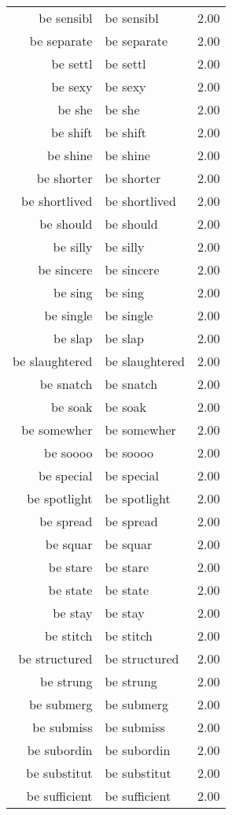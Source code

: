 \begin{table}[ht]
\begin{tabular}{rlr}
  be sensibl & be sensibl & 2.00 \\ 
  be separate & be separate & 2.00 \\ 
  be settl & be settl & 2.00 \\ 
  be sexy & be sexy & 2.00 \\ 
  be she & be she & 2.00 \\ 
  be shift & be shift & 2.00 \\ 
  be shine & be shine & 2.00 \\ 
  be shorter & be shorter & 2.00 \\ 
  be shortlived & be shortlived & 2.00 \\ 
  be should & be should & 2.00 \\ 
  be silly & be silly & 2.00 \\ 
  be sincere & be sincere & 2.00 \\ 
  be sing & be sing & 2.00 \\ 
  be single & be single & 2.00 \\ 
  be slap & be slap & 2.00 \\ 
  be slaughtered & be slaughtered & 2.00 \\ 
  be snatch & be snatch & 2.00 \\ 
  be soak & be soak & 2.00 \\ 
  be somewher & be somewher & 2.00 \\ 
  be soooo & be soooo & 2.00 \\ 
  be special & be special & 2.00 \\ 
  be spotlight & be spotlight & 2.00 \\ 
  be spread & be spread & 2.00 \\ 
  be squar & be squar & 2.00 \\ 
  be stare & be stare & 2.00 \\ 
  be state & be state & 2.00 \\ 
  be stay & be stay & 2.00 \\ 
  be stitch & be stitch & 2.00 \\ 
  be structured & be structured & 2.00 \\ 
  be strung & be strung & 2.00 \\ 
  be submerg & be submerg & 2.00 \\ 
  be submiss & be submiss & 2.00 \\ 
  be subordin & be subordin & 2.00 \\ 
  be substitut & be substitut & 2.00 \\ 
  be sufficient & be sufficient & 2.00 \\ 

\end{tabular}
\end{table}
